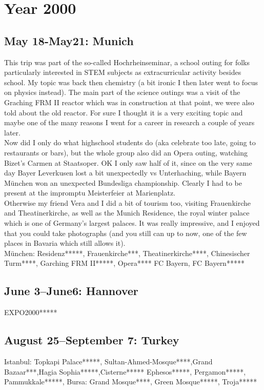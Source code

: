 \chapter{Year 2000}
\label{2000}

\section{May 18-May21: Munich}
\label{2000:Munich}

This trip was part of the so-called Hochrheinseminar, a school outing for folks particularly interested in STEM subjects as extracurricular activity besides school. My topic was back then chemistry (a bit ironic I then later went to focus on physics instead). The main part of the science outings was a visit of the Graching FRM II reactor which was in construction at that point, we were also told about the old reactor. For sure I thought it is a very exciting topic and maybe one of the many reasons I went for a career in research a couple of years later.\\
Now did I only do what highschool students do (aka celebrate too late, going to restaurants or bars), but the whole group also did an Opera outing, watching Bizet's Carmen at Staatsoper. OK I only saw half of it, since on the very same day Bayer Leverkusen lost a bit unexpectedly vs Unterhaching, while Bayern M\"unchen won an unexpected Bundesliga championship. Clearly I had to be present at the impromptu Meisterfeier at Marienplatz.\\
Otherwise my friend Vera and I did a bit of tourism too, visiting Frauenkirche and Theatinerkirche, as well as the Munich Residence, the royal winter palace which is one of Germany's largest palaces. It was really impressive, and I enjoyed that you could take photographs (and you still can up to now, one of the few places in Bavaria which still allows it).\\ 

M\"unchen: Residenz*****, Frauenkirche***, Theatinerkirche****, Chinesischer Turm****, Garching FRM II*****, Opera****
FC Bayern, FC Bayern*****

\section{June 3--June6: Hannover}
\label{2000:Hannover}

EXPO2000*****

\section{August 25--September 7: Turkey}
\label{2000:Turkey}


Istanbul: Topkapi Palace*****, Sultan-Ahmed-Mosque****,Grand Bazaar***,Hagia Sophia*****,Cisterne*****
Ephesos*****, Pergamon*****, Pammukkale*****, Bursa: Grand Mosque****, Green Mosque*****, Troja*****